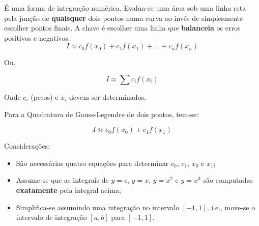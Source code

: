 É uma forma de integração numérica. Evalua-se uma área sob uma linha reta pela junção de \textbf{quaisquer} dois pontos numa curva ao invés de simplesmente escolher pontos finais. A chave é escolher uma linha que \textbf{balanceia} os erros positivos e negativos.
$$I\approx c_0 f(x_0)+c_1 f(x_1)+\dots + c_{n} f(x_{n})$$

Ou,

$$I\approx \sum c_i f(x_i)$$

Onde $c_i$ (pesos) e $x_i$ devem ser determinados.

Para a Quadratura de Gauss-Legendre de dois pontos, tem-se:

$$I\approx c_0 f(x_0)+c_1 f(x_1)$$

Considerações:
\begin{itemize}
	\item São necessárias quatro equações para determinar $c_0$, $c_1$, $x_0$ e $x_1$;
	\item Assume-se que as integrais de $y=c$, $y=x$, $y=x^2$ e $y=x^3$ são computadas \textbf{exatamente} pela integral acima;
	\item Simplifica-se assumindo uma integração no intervalo $[-1, 1]$, i.e., move-se o intervalo de integração $[a,b]$ para $[-1, 1]$.
\end{itemize}